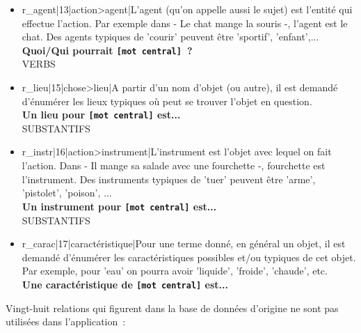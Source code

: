 \documentclass[a4paper,11pt,french]{article}
\begin{document}
\begin{itemize}
\item r\_agent|13|action>agent|L'agent (qu'on appelle aussi le sujet) est l'entité qui effectue l'action. Par exemple dans - Le chat mange la souris -, l'agent est le chat. Des agents typiques de 'courir' peuvent être 'sportif', 'enfant',... \\
{\bf Quoi/Qui pourrait \verb![mot central]!~?} \\
VERBS

\item r\_lieu|15|chose>lieu|A partir d'un nom d'objet (ou autre), il est demandé d'énumérer les lieux typiques où peut se trouver l'objet en question. \\
{\bf Un lieu pour \verb![mot central]! est...} \\
SUBSTANTIFS

\item r\_instr|16|action>instrument|L'instrument est l'objet avec lequel on fait l'action. Dans - Il mange sa salade avec une fourchette -, fourchette est l'instrument. Des instruments typiques de 'tuer' peuvent être 'arme', 'pistolet', 'poison', ... \\
{\bf Un instrument pour \verb![mot central]! est...} \\
SUBSTANTIFS

\item r\_carac|17|caractéristique|Pour une terme donné, en général un objet, il est demandé d'énumérer les caractéristiques possibles et/ou typiques de cet objet. Par exemple, pour 'eau' on pourra avoir 'liquide', 'froide', 'chaude', etc. \\
{\bf Une caractéristique de \verb![mot central]! est...}

\end{itemize}

Vingt-huit relations qui figurent dans la base de données d'origine ne sont pas utilisées dans l'application~:
\end{document}
